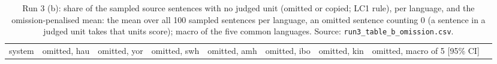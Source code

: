 \begin{table}[t]
\centering
\scriptsize
\setlength{\tabcolsep}{3pt}
\caption{Run 3 (b): share of the sampled source sentences with no judged unit (omitted or copied; LC1 rule), per language, and the omission-penalised mean: the mean over all 100 sampled sentences per language, an omitted sentence counting 0 (a sentence in a judged unit takes that unit\textquotesingle s score); macro of the five common languages. Source: \texttt{run3\_table\_b\_omission.csv}.}
\label{tab:t_judge_j2_run3_omission}
{\def\LTcaptype{none} %
\begin{tabular}{@{}
  >{\raggedright\arraybackslash}p{}
  >{\raggedleft\arraybackslash}p{}
  >{\raggedleft\arraybackslash}p{}
  >{\raggedleft\arraybackslash}p{}
  >{\raggedleft\arraybackslash}p{}
  >{\raggedleft\arraybackslash}p{}
  >{\raggedleft\arraybackslash}p{}
  >{\raggedleft\arraybackslash}p{}
  >{\raggedleft\arraybackslash}p{}@{}}
\toprule
\begin{minipage}[b]{\linewidth}\raggedright
system
\end{minipage} & \begin{minipage}[b]{\linewidth}\raggedleft
omitted, hau
\end{minipage} & \begin{minipage}[b]{\linewidth}\raggedleft
omitted, yor
\end{minipage} & \begin{minipage}[b]{\linewidth}\raggedleft
omitted, swh
\end{minipage} & \begin{minipage}[b]{\linewidth}\raggedleft
omitted, amh
\end{minipage} & \begin{minipage}[b]{\linewidth}\raggedleft
omitted, ibo
\end{minipage} & \begin{minipage}[b]{\linewidth}\raggedleft
omitted, kin
\end{minipage} & \begin{minipage}[b]{\linewidth}\raggedleft
omitted, macro of 5 {[}95\% CI{]}
\end{minipage} & \begin{minipage}[b]{\linewidth}\raggedleft

\end{minipage}
\end{tabular}}
\end{table}
